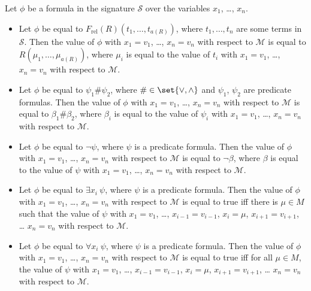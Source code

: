 \begin{definition}
  Let $\phi$ be a formula in the signature $\mathcal{S}$ over the variables
  $x_1$, \dots, $x_n$.
  \begin{itemize}
    \item Let $\phi$ be equal to $F_\mathrm{rel}(R)(t_1, \dots, t_{a(R)})$,
      where $t_1, \dots, t_n$ are some terms in $\mathcal{S}$. Then the value
      of $\phi$ with $x_1 = v_1$, \dots, $x_n = v_n$ with respect to
      $\mathcal{M}$ is equal to $R(\mu_1, \dots, \mu_{a(R)})$, where $\mu_i$
      is equal to the value of $t_i$ with $x_1 = v_1$, \dots, $x_n = v_n$ with
      respect to $\mathcal{M}$.
    \item Let $\phi$ be equal to $\psi_1 \# \psi_2$, where
      $\# \in \set{\lor, \land}$ and $\psi_1$, $\psi_2$ are predicate
      formulas. Then the value of $\phi$ with $x_1 = v_1$, \dots, $x_n = v_n$
      with respect to $\mathcal{M}$ is equal to $\beta_1 \# \beta_2$, where
      $\beta_i$ is equal to the value of $\psi_i$ with $x_1 = v_1$, \dots,
      $x_n = v_n$ with respect to $\mathcal{M}$.
    \item Let $\phi$ be equal to $\lnot \psi$, where
      $\psi$ is a predicate formula.
      Then the value of $\phi$ with $x_1 = v_1$, \dots, $x_n = v_n$ with
      respect to $\mathcal{M}$ is equal to $\lnot \beta$, where
      $\beta$ is equal to the value of $\psi$ with $x_1 = v_1$, \dots,
      $x_n = v_n$ with respect to $\mathcal{M}$.
    \item Let $\phi$ be equal to $\exists x_i ~ \psi$, where
      $\psi$ is a predicate formula.
      Then the value of $\phi$ with $x_1 = v_1$, \dots, $x_n = v_n$ with
      respect to $\mathcal{M}$ is equal to true iff there is $\mu \in M$
      such that the value of $\psi$ with $x_1 = v_1$, \dots,
      $x_{i - 1} = v_{i - 1}$, $x_i = \mu$, $x_{i + 1} = v_{i + 1}$, \dots
      $x_n = v_n$ with respect to $\mathcal{M}$.
    \item Let $\phi$ be equal to $\forall x_i ~ \psi$, where
      $\psi$ is a predicate formula.
      Then the value of $\phi$ with $x_1 = v_1$, \dots, $x_n = v_n$ with
      respect to $\mathcal{M}$ is equal to true iff for all $\mu \in M$,
      the value of $\psi$ with $x_1 = v_1$, \dots,
      $x_{i - 1} = v_{i - 1}$, $x_i = \mu$, $x_{i + 1} = v_{i + 1}$, \dots
      $x_n = v_n$ with respect to $\mathcal{M}$.
  \end{itemize}
\end{definition}

